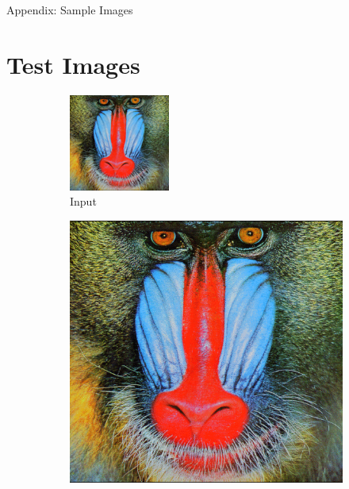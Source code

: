 \documentclass[12pt,a4paper]{article}
\begin{document}
    \begin{center}
        \LARGE Appendix: Sample Images
    \end{center}\label{samples}

    \section*{Test Images}
        \begin{figure}[H]
            \centering
            \begin{subfigure}{0.2\textwidth}
                \includegraphics[width=\textwidth]{images/samples/img-1-input.png}
                \caption*{Input}
            \end{subfigure}
            \enspace
            \begin{subfigure}{0.2\textwidth}
                \includegraphics[width=\textwidth]{images/samples/img-1-orig.png}

\end{subfigure}
\end{figure}
\end{document}
